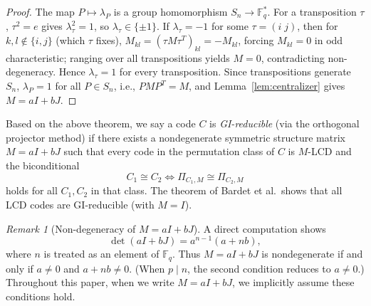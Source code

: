 \documentclass[11pt]{article}
\newcommand{\FF}{\mathbb{F}}
\newcommand{\0}{\mathbf{0}}
\newcommand{\1}{\mathbf{1}}
\theoremstyle{plain}
\theoremstyle{definition}
\theoremstyle{remark}
\newtheorem{remark}[theorem]{Remark}
\begin{document}
\begin{proof}
The map $P \mapsto \lambda_P$ is a group homomorphism $S_n \to \FF_q^*$. For a transposition $\tau$, $\tau^2 = e$ gives $\lambda_\tau^2 = 1$, so $\lambda_\tau \in \{\pm 1\}$. If $\lambda_\tau = -1$ for some $\tau = (i\;j)$, then for $k, l \notin \{i, j\}$ (which $\tau$ fixes), $M_{kl} = (\tau M \tau^T)_{kl} = -M_{kl}$, forcing $M_{kl} = 0$ in odd characteristic; ranging over all transpositions yields $M = 0$, contradicting non-degeneracy. Hence $\lambda_\tau = 1$ for every transposition. Since transpositions generate $S_n$, $\lambda_P = 1$ for all $P \in S_n$, i.e., $PMP^T = M$, and Lemma~\ref{lem:centralizer} gives $M = aI + bJ$.
\end{proof}

Based on the above theorem, we say a code $C$ is \emph{GI-reducible} (via the orthogonal projector method) if there exists a nondegenerate symmetric structure matrix $M=aI+bJ$ such that every code in the permutation class of $C$ is $M$-LCD and the biconditional
\[
C_1 \cong C_2 \iff \Pi_{C_1,M} \cong \Pi_{C_2,M}
\]
holds for all $C_1, C_2$ in that class. The theorem of Bardet et al.\ shows that all LCD codes are GI-reducible (with $M = I$).

\begin{remark}[Non-degeneracy of $M = aI + bJ$]
\label{rem:nondegeneracy}
A direct computation shows
\[
\det(aI + bJ) = a^{n-1}(a + nb),
\]
where $n$ is treated as an element of $\mathbb{F}_q$. Thus $M = aI + bJ$ is nondegenerate if and only if $a \neq 0$ and $a + nb \neq 0$. (When $p \mid n$, the second condition reduces to $a \neq 0$.) Throughout this paper, when we write $M = aI + bJ$, we implicitly assume these conditions hold.
\end{remark}
\end{document}
